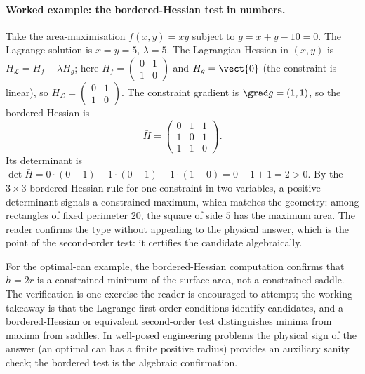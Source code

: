 \paragraph{Worked example: the bordered-Hessian test in numbers.}
Take the area-maximisation $f(x, y) = xy$ subject to $g = x + y - 10
= 0$. The Lagrange solution is $x = y = 5$, $\lambda = 5$. The
Lagrangian Hessian in $(x, y)$ is $H_{\mathcal{L}} = H_{f} - \lambda
H_{g}$; here $H_{f} = \begin{pmatrix} 0 & 1 \\ 1 & 0 \end{pmatrix}$
and $H_{g} = \vect{0}$ (the constraint is linear), so
$H_{\mathcal{L}} = \begin{pmatrix} 0 & 1 \\ 1 & 0 \end{pmatrix}$.
The constraint gradient is $\grad g = (1, 1)$, so the bordered
Hessian is
\[
\bar{H} = \begin{pmatrix} 0 & 1 & 1 \\ 1 & 0 & 1 \\ 1 & 1 & 0
\end{pmatrix}.
\]
Its determinant is $\det\bar{H} = 0\cdot(0 - 1) - 1\cdot(0 - 1) +
1\cdot(1 - 0) = 0 + 1 + 1 = 2 > 0$. By the $3 \times 3$
bordered-Hessian rule for one constraint in two variables, a
positive determinant signals a constrained maximum, which matches the
geometry: among rectangles of fixed perimeter $20$, the square of
side $5$ has the maximum area. The reader confirms the type without
appealing to the physical answer, which is the point of the
second-order test: it certifies the candidate algebraically.

For the optimal-can example, the bordered-Hessian computation
confirms that $h = 2 r$ is a constrained minimum of the surface
area, not a constrained saddle. The verification is one exercise
the reader is encouraged to attempt; the working takeaway is that
the Lagrange first-order conditions identify candidates, and a
bordered-Hessian or equivalent second-order test distinguishes
minima from maxima from saddles. In well-posed engineering problems
the physical sign of the answer (an optimal can has a finite
positive radius) provides an auxiliary sanity check; the bordered
test is the algebraic confirmation.

